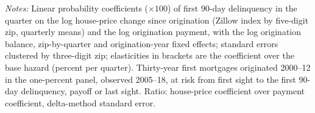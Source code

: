 \begin{table}[H]
\centering
\caption{The equity margin against the payment margin, first mortgages}
\label{tab:equity_margin}
\small
\resizebox{\textwidth}{!}{}
\vspace{0.5em}
\begin{minipage}{0.92\textwidth}
\noindent \small \textit{Notes:} Linear probability coefficients ($\times 100$) of first 90-day delinquency in the quarter on the log house-price change since origination (Zillow index by five-digit zip, quarterly means) and the log origination payment, with the log origination balance, zip-by-quarter and origination-year fixed effects; standard errors clustered by three-digit zip; elasticities in brackets are the coefficient over the base hazard (percent per quarter). Thirty-year first mortgages originated 2000--12 in the one-percent panel, observed 2005--18, at risk from first sight to the first 90-day delinquency, payoff or last sight. Ratio: house-price coefficient over payment coefficient, delta-method standard error.
\end{minipage}
\end{table}
